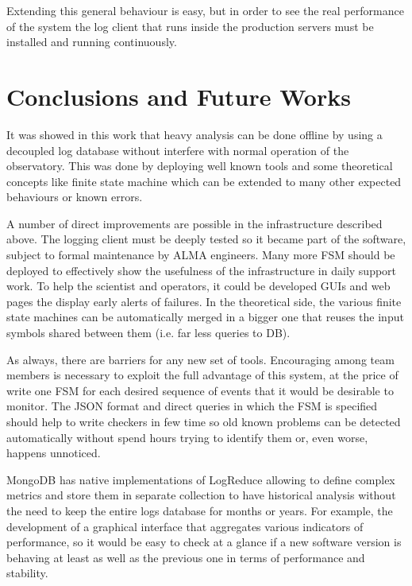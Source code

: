 \documentclass[]{spie}  %
\begin{document}
Extending this general behaviour is easy, but in order to see the real
performance of the system the log client that runs inside the production
servers must be installed and running continuously.

\section{Conclusions and Future Works}
It was showed in this work that heavy analysis can be done offline by using a
decoupled log database without interfere with normal operation of the
observatory. This was done by deploying well known tools and some theoretical
concepts like finite state machine which can be extended to many other expected
behaviours or known errors. 

A number of direct improvements are possible in the infrastructure described
above. The logging client must be deeply tested so it became part of the
software, subject to formal maintenance by ALMA engineers. Many more FSM should
be deployed to effectively show the usefulness of the infrastructure in daily
support work. To help the scientist and operators, it could be developed GUIs
and web pages the display early alerts of failures. In the theoretical side,
    the various finite state machines can be automatically merged in a bigger
    one that reuses the input symbols shared between them (i.e. far less
            queries to DB). 

As always, there are barriers for any new set of tools. Encouraging among team
members is necessary to exploit the full advantage of this system, at the price
of write one FSM for each desired sequence of events that it would be desirable
to monitor. The JSON format and direct queries in which the FSM is specified
should help to write checkers in few time so old known problems can be detected
automatically without spend hours trying to identify them or, even worse,
              happens unnoticed.

MongoDB has native implementations of LogReduce allowing to define complex
metrics and store them in separate collection to have historical analysis
without the need to keep the entire logs database for months or years. For
example, the development of a graphical interface that aggregates various
indicators of performance, so it would be easy to check at a glance if a new
software version is behaving at least as well as the previous one in terms of
performance and stability.
 
\end{document}
